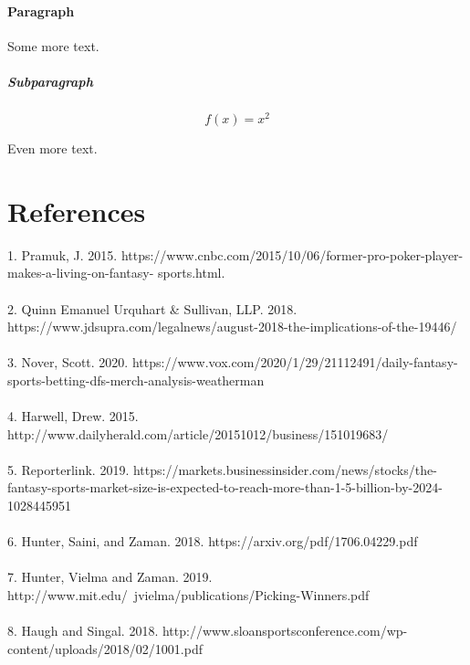\documentclass{article}
\begin{document}
\paragraph{Paragraph}

Some more text.

\subparagraph{Subparagraph}

\begin{equation}
	f(x) = x^2
\end{equation}

Even more text.

\section*{References}

1. Pramuk, J. 2015. https://www.cnbc.com/2015/10/06/former-pro-poker-player-makes-a-living-on-fantasy- sports.html.\\
\\
2. Quinn Emanuel Urquhart \& Sullivan, LLP. 2018. https://www.jdsupra.com/legalnews/august-2018-the-implications-of-the-19446/\\
\\
3. Nover, Scott. 2020. https://www.vox.com/2020/1/29/21112491/daily-fantasy-sports-betting-dfs-merch-analysis-weatherman\\
\\
4. Harwell, Drew. 2015. http://www.dailyherald.com/article/20151012/business/151019683/\\
\\
5. Reporterlink. 2019. https://markets.businessinsider.com/news/stocks/the-fantasy-sports-market-size-is-expected-to-reach-more-than-1-5-billion-by-2024-1028445951\\
\\
6. Hunter, Saini, and Zaman. 2018. https://arxiv.org/pdf/1706.04229.pdf\\
\\
7. Hunter, Vielma and Zaman. 2019. http://www.mit.edu/~jvielma/publications/Picking-Winners.pdf\\
\\
8. Haugh and Singal. 2018. http://www.sloansportsconference.com/wp-content/uploads/2018/02/1001.pdf
\end{document}
